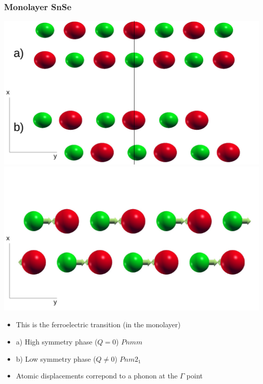 \documentclass{beamer}
\begin{document}
\begin{frame}

\frametitle{Monolayer SnSe}
\begin{center}
 \includegraphics[width=0.49\linewidth]{Pictures/MonoSnSe/monolayer-structure.pdf}
 \includegraphics[width=0.49\linewidth]{Pictures/MonoSnSe/transition-mono.pdf}
\end{center}
\begin{itemize}
 \item This is the ferroelectric transition (in the monolayer)
 \item a) High symmetry phase ($Q=0$) $Pnmm$
 \item b) Low symmetry phase ($Q\ne0$) $Pnm2_{1}$
 \item Atomic displacements correpond to a phonon at the $\Gamma$ point
\end{itemize}

\end{frame}

\end{document}
